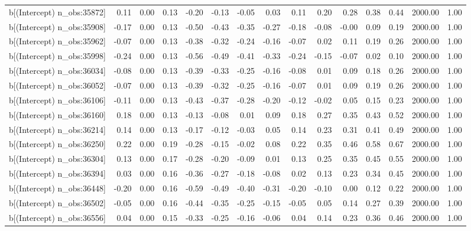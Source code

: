 \begin{table}[ht]
\begin{tabular}{rrrrrrrrrrrrrrr}
  b[(Intercept) n\_obs:35872] & 0.11 & 0.00 & 0.13 & -0.20 & -0.13 & -0.05 & 0.03 & 0.11 & 0.20 & 0.28 & 0.38 & 0.44 & 2000.00 & 1.00 \\ 
  b[(Intercept) n\_obs:35908] & -0.17 & 0.00 & 0.13 & -0.50 & -0.43 & -0.35 & -0.27 & -0.18 & -0.08 & -0.00 & 0.09 & 0.19 & 2000.00 & 1.00 \\ 
  b[(Intercept) n\_obs:35962] & -0.07 & 0.00 & 0.13 & -0.38 & -0.32 & -0.24 & -0.16 & -0.07 & 0.02 & 0.11 & 0.19 & 0.26 & 2000.00 & 1.00 \\ 
  b[(Intercept) n\_obs:35998] & -0.24 & 0.00 & 0.13 & -0.56 & -0.49 & -0.41 & -0.33 & -0.24 & -0.15 & -0.07 & 0.02 & 0.10 & 2000.00 & 1.00 \\ 
  b[(Intercept) n\_obs:36034] & -0.08 & 0.00 & 0.13 & -0.39 & -0.33 & -0.25 & -0.16 & -0.08 & 0.01 & 0.09 & 0.18 & 0.26 & 2000.00 & 1.00 \\ 
  b[(Intercept) n\_obs:36052] & -0.07 & 0.00 & 0.13 & -0.39 & -0.32 & -0.25 & -0.16 & -0.07 & 0.01 & 0.09 & 0.19 & 0.26 & 2000.00 & 1.00 \\ 
  b[(Intercept) n\_obs:36106] & -0.11 & 0.00 & 0.13 & -0.43 & -0.37 & -0.28 & -0.20 & -0.12 & -0.02 & 0.05 & 0.15 & 0.23 & 2000.00 & 1.00 \\ 
  b[(Intercept) n\_obs:36160] & 0.18 & 0.00 & 0.13 & -0.13 & -0.08 & 0.01 & 0.09 & 0.18 & 0.27 & 0.35 & 0.43 & 0.52 & 2000.00 & 1.00 \\ 
  b[(Intercept) n\_obs:36214] & 0.14 & 0.00 & 0.13 & -0.17 & -0.12 & -0.03 & 0.05 & 0.14 & 0.23 & 0.31 & 0.41 & 0.49 & 2000.00 & 1.00 \\ 
  b[(Intercept) n\_obs:36250] & 0.22 & 0.00 & 0.19 & -0.28 & -0.15 & -0.02 & 0.08 & 0.22 & 0.35 & 0.46 & 0.58 & 0.67 & 2000.00 & 1.00 \\ 
  b[(Intercept) n\_obs:36304] & 0.13 & 0.00 & 0.17 & -0.28 & -0.20 & -0.09 & 0.01 & 0.13 & 0.25 & 0.35 & 0.45 & 0.55 & 2000.00 & 1.00 \\ 
  b[(Intercept) n\_obs:36394] & 0.03 & 0.00 & 0.16 & -0.36 & -0.27 & -0.18 & -0.08 & 0.02 & 0.13 & 0.23 & 0.34 & 0.45 & 2000.00 & 1.00 \\ 
  b[(Intercept) n\_obs:36448] & -0.20 & 0.00 & 0.16 & -0.59 & -0.49 & -0.40 & -0.31 & -0.20 & -0.10 & 0.00 & 0.12 & 0.22 & 2000.00 & 1.00 \\ 
  b[(Intercept) n\_obs:36502] & -0.05 & 0.00 & 0.16 & -0.44 & -0.35 & -0.25 & -0.15 & -0.05 & 0.05 & 0.14 & 0.27 & 0.39 & 2000.00 & 1.00 \\ 
  b[(Intercept) n\_obs:36556] & 0.04 & 0.00 & 0.15 & -0.33 & -0.25 & -0.16 & -0.06 & 0.04 & 0.14 & 0.23 & 0.36 & 0.46 & 2000.00 & 1.00 \\ 

\end{tabular}
\end{table}
